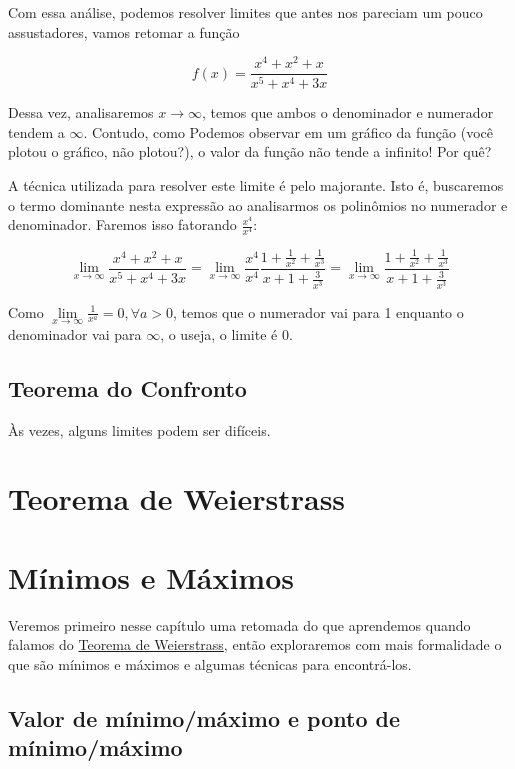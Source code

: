 \documentclass[
  portuguese,
  letterpaper,
  DIV=11,
  numbers=noendperiod]{scrreport}
\begin{document}
Com essa análise, podemos resolver limites que antes nos pareciam um
pouco assustadores, vamos retomar a função

\[
f(x) = \frac{x^4 + x^2 + x}{x^5 + x^4 + 3x}
\]

Dessa vez, analisaremos \(x\rightarrow \infty\), temos que ambos o
denominador e numerador tendem a \(\infty\). Contudo, como Podemos
observar em um gráfico da função (você plotou o gráfico, não plotou?), o
valor da função não tende a infinito! Por quê?

A técnica utilizada para resolver este limite é pelo majorante. Isto é,
buscaremos o termo dominante nesta expressão ao analisarmos os
polinômios no numerador e denominador. Faremos isso fatorando
\(\frac{x^4}{x^4}\):

\[
\lim_{x\rightarrow \infty} \frac{x^4 + x^2 + x}{x^5 + x^4 + 3x} =
\lim_{x\rightarrow \infty} \frac{x^4}{x^4} \frac{1 + \frac{1}{x^2} + \frac{1}{x^3}}
{x + 1 + \frac{3}{x^3}} =
\lim_{x\rightarrow \infty} \frac{1 + \frac{1}{x^2} + \frac{1}{x^3}}
{x + 1 + \frac{3}{x^3}}
\]

Como
\(\lim\limits_{x\rightarrow \infty} \frac{1}{x^a} = 0, \forall a > 0\),
temos que o numerador vai para 1 enquanto o denominador vai para
\(\infty\), o useja, o limite é 0.

\section{Teorema do Confronto}\label{sec-confronto}

Às vezes, alguns limites podem ser difíceis.

\chapter{Teorema de Weierstrass}\label{sec-weierstrass}

\chapter{Mínimos e Máximos}\label{muxednimos-e-muxe1ximos}

Veremos primeiro nesse capítulo uma retomada do que aprendemos quando
falamos do \hyperref[sec-weierstrass]{Teorema de Weierstrass}, então
exploraremos com mais formalidade o que são mínimos e máximos e algumas
técnicas para encontrá-los.

\section{Valor de mínimo/máximo e ponto de
mínimo/máximo}\label{valor-de-muxednimomuxe1ximo-e-ponto-de-muxednimomuxe1ximo}
\end{document}
